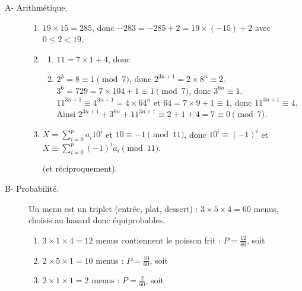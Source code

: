 \begin{description}
	\item[A- Arithmétique.]
	\begin{enumerate}
		\item {}
			$19 \times 15 = 285$, donc $-283 = -285 + 2 = 19 \times (-15) + 2$ avec $0 \leq 2 < 19$.
			\par\noindent{}
		\item
		\begin{enumerate}
			\item {}
				$11 = 7 \times 1 + 4$, donc \par\noindent{}
			\item {}
				$2^3 = 8 \equiv 1 \pmod 7$, donc $2^{3n+1} = 2 \times 8^n \equiv 2$.
				$3^6 = 729 = 7 \times 104 + 1 \equiv 1 \pmod 7$, donc $3^{6n} \equiv 1$.
				$11^{3n+1} \equiv 4^{3n+1} = 4 \times 64^n$ et $64 = 7 \times 9 + 1 \equiv 1$, donc $11^{3n+1} \equiv 4$.
				Ainsi $2^{3n+1} + 3^{6n} + 11^{3n+1} \equiv 2 + 1 + 4 = 7 \equiv 0 \pmod 7$.
				\par\noindent{}
		\end{enumerate}
		\item {}
			$X = \sum_{i=0}^{p} a_i 10^i$ et $10 \equiv -1 \pmod{11}$, donc $10^i \equiv (-1)^i$ et
			$X \equiv \sum_{i=0}^{p} (-1)^i a_i \pmod{11}$.
			\par\noindent{}
			(et réciproquement).
	\end{enumerate}
	\item[B- Probabilité.]
	Un menu est un triplet (entrée, plat, dessert) : $3 \times 5 \times 4 = 60$ menus, choisis au hasard donc équiprobables.
	\begin{enumerate}
		\item {}
			$3 \times 1 \times 4 = 12$ menus contiennent le poisson frit : $P = \frac{12}{60}$, soit \par\noindent{}
		\item {}
			$2 \times 5 \times 1 = 10$ menus : $P = \frac{10}{60}$, soit \par\noindent{}
		\item {}
			$2 \times 1 \times 1 = 2$ menus : $P = \frac{2}{60}$, soit \par\noindent{}
	\end{enumerate}
\end{description}
